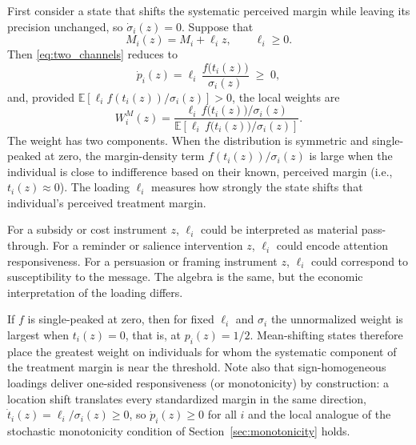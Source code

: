 \documentclass[11pt]{article}
\newcommand{\E}{\mathbb{E}}
\newcommand{\1}{\mathbf{1}}
\begin{document}
First consider a state that shifts the systematic perceived margin while
leaving its precision unchanged, so \(\dot\sigma_i(z)=0\). Suppose that
\[
M_i(z)=M_i+\ell_i z,
\qquad
\ell_i\geq 0.
\]
Then \eqref{eq:two_channels} reduces to
\[
\dot p_i(z)
=
\ell_i\,\frac{f\big(t_i(z)\big)}{\sigma_i(z)}
\;\geq\;0,
\]
and, provided \(\E[\ell_i f(t_i(z))/\sigma_i(z)]>0\), the local weights are
\begin{equation}
W_i^{M}(z)
=
\frac{\ell_i\,f\big(t_i(z)\big)/\sigma_i(z)}
     {\E\!\left[\ell_i\,f\big(t_i(z)\big)/\sigma_i(z)\right]}.
\label{eq:location_weight}
\end{equation}
The weight has two components. When the distribution is symmetric and single-peaked at zero, the margin-density term
\(f(t_i(z))/\sigma_i(z)\) is large when the individual is close to
indifference based on their known, perceived margin (i.e., $t_i(z) \approx 0$). The loading \(\ell_i\) measures how
strongly the state shifts that individual's perceived treatment margin.

For a subsidy or cost
instrument $z$, \(\ell_i\) could be interpreted as material pass-through. For a reminder or
salience intervention $z$, \(\ell_i\) could encode attention responsiveness. For a
persuasion or framing instrument $z$, \(\ell_i\) could correspond to susceptibility to the
message. The algebra is the same, but the economic interpretation of the
loading differs.

If \(f\) is single-peaked at zero, then for fixed \(\ell_i\) and
\(\sigma_i\) the unnormalized weight is largest when \(t_i(z)=0\), that is,
at \(p_i(z)=1/2\). Mean-shifting states therefore place the greatest weight
on individuals for whom the systematic component of the treatment margin is near the threshold. Note also
that sign-homogeneous loadings deliver one-sided responsiveness (or monotonicity) by
construction: a location shift translates every standardized margin in the
same direction, \(\dot t_i(z)=\ell_i/\sigma_i(z)\geq 0\), so
\(\dot p_i(z)\geq 0\) for all \(i\) and the local analogue of the
stochastic monotonicity condition of Section~\ref{sec:monotonicity} holds.
\end{document}

